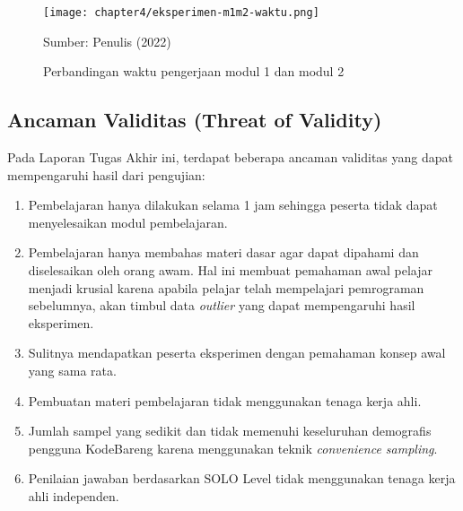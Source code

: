 \begin{figure}[!h]
  \centering
  \texttt{[image: chapter4/eksperimen-m1m2-waktu.png]}
  \caption{Perbandingan waktu pengerjaan modul 1 dan modul 2} \label{fig:eksperimen-m1m2-waktu}
  Sumber: Penulis (2022)
\end{figure}

\subsection{Ancaman Validitas (Threat of Validity)}

Pada Laporan Tugas Akhir ini, terdapat beberapa ancaman validitas yang dapat mempengaruhi hasil dari pengujian:
\begin{enumerate}
  \item Pembelajaran hanya dilakukan selama 1 jam sehingga peserta tidak dapat menyelesaikan modul pembelajaran.
  \item Pembelajaran hanya membahas materi dasar agar dapat dipahami dan diselesaikan oleh orang awam. Hal ini membuat pemahaman awal pelajar menjadi krusial karena apabila pelajar telah mempelajari pemrograman sebelumnya, akan timbul data \textit{outlier} yang dapat mempengaruhi hasil eksperimen.
  \item Sulitnya mendapatkan peserta eksperimen dengan pemahaman konsep awal yang sama rata.
  \item Pembuatan materi pembelajaran tidak menggunakan tenaga kerja ahli.
  \item Jumlah sampel yang sedikit dan tidak memenuhi keseluruhan demografis pengguna KodeBareng karena menggunakan teknik \textit{convenience sampling}.
  \item Penilaian jawaban berdasarkan SOLO Level tidak menggunakan tenaga kerja ahli independen.
\end{enumerate}
